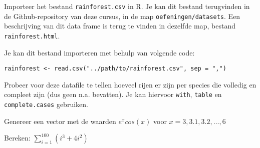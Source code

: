 \begin{exercise}
  Importeer het bestand \texttt{rainforest.csv} in R.
  Je kan dit bestand terugvinden in de Github-repository van deze cursus, in de map \texttt{oefeningen/datasets}. 
  Een beschrijving van dit data frame is terug te vinden in dezelfde map, bestand \texttt{rainforest.html}.
    
  Je kan dit bestand importeren met behulp van volgende code:
  \begin{lstlisting}
rainforest <- read.csv("../path/to/rainforest.csv", sep = ",")
  \end{lstlisting}
  
  Probeer voor deze datafile te tellen hoeveel rijen er zijn per species die volledig en compleet zijn (dus geen n.a. bevatten). 
  Je kan hiervoor \texttt{with}, \texttt{table} en \texttt{complete.cases} gebruiken. 
\end{exercise}

\begin{exercise}
	Genereer een vector met de waarden $e^x cos(x)$ voor $x= 3, 3.1, 3.2, \dots ,6$
\end{exercise}

\begin{exercise}
	Bereken: $\sum_{i=1}^{100}(i^3 + 4i^2)$
\end{exercise}
